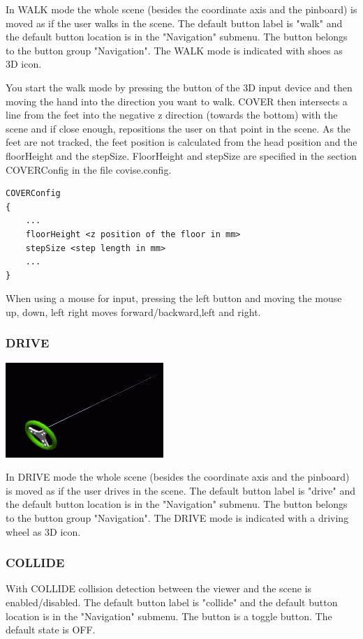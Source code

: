 In WALK mode the whole scene (besides the coordinate axis and the pinboard) 
is moved as if the user walks in the scene. 
The default button label is "walk" and
the default button location is in the "Navigation" submenu. 
The button belongs to the button group "Navigation".
The WALK mode is indicated with shoes as 3D icon.

You start the walk mode by pressing the button of the 3D input device
and then moving the hand into the direction you want to walk. COVER
then intersects a line from the feet into the negative z direction (towards the
bottom) with the scene and if close enough, repositions the user on that
point in the scene. 
As the feet are not tracked, the feet position is calculated from the
head position  and the floorHeight and the stepSize. FloorHeight and stepSize
are specified in the section COVERConfig in the file covise.config.
\begin{verbatim}
COVERConfig
{
    ...
    floorHeight <z position of the floor in mm>
    stepSize <step length in mm>
    ...
}
\end{verbatim}
	

When using a mouse for input, pressing the left button and moving the mouse
up, down, left right moves forward/backward,left and right.

\subsubsection{DRIVE}
\latexonly
\includegraphics[scale=0.5]{cover/pict/drive} 
\endlatexonly
{}

In DRIVE mode the whole scene (besides the coordinate axis and the pinboard) 
is moved as if the user drives in the scene. 
The default button label is "drive" and
the default button location is in the "Navigation" submenu. 
The button belongs to the button group "Navigation".
The DRIVE mode is indicated with a driving wheel as 3D icon.


\subsubsection{COLLIDE}
With COLLIDE collision detection between the viewer and the scene
is enabled/disabled.
The default button label is "collide" and
the default button location is in the "Navigation" submenu. 
The button is a toggle button. The default state is OFF.



